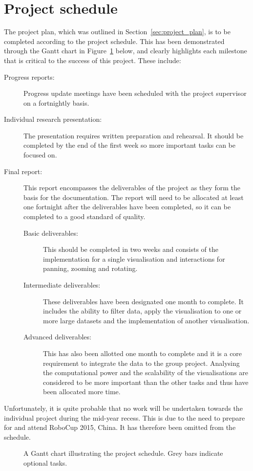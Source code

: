 \documentclass[a4paper]{article}
\begin{document}
	\section{Project schedule} {
	\label{sec:project_schedule}
	
		The project plan, which was outlined in Section~\ref{sec:project_plan}, is to be completed according to the project schedule. This has been demonstrated through the Gantt chart in Figure~\ref{gantt:schedule} below, and clearly highlights each milestone that is critical to the success of this project. These include:
		
		\begin{description}
			\item[Progress reports:] Progress update meetings have been scheduled with the project supervisor on a fortnightly basis.
			\item[Individual research presentation:] The presentation requires written preparation and rehearsal. It should be completed by the end of the first week so more important tasks can be focused on.
			\item[Final report:] This report encompasses the deliverables of the project as they form the basis for the documentation. The report will need to be allocated at least one fortnight after the deliverables have been completed, so it can be completed to a good standard of quality.
			\begin{description}
				\item[Basic deliverables:] This should be completed in two weeks and consists of the implementation for a single visualisation and interactions for panning, zooming and rotating.
				\item[Intermediate deliverables:] These deliverables have been designated one month to complete. It includes the ability to filter data, apply the visualisation to one or more large datasets and the implementation of another visualisation.
				\item[Advanced deliverables:] This has also been allotted one month to complete and it is a core requirement to integrate the data to the group project. Analysing the computational power and the scalability of the visualisations are considered to be more important than the other tasks and thus have been allocated more time.
			\end{description}
		\end{description}
		
		Unfortunately, it is quite probable that no work will be undertaken towards the individual project during the mid-year recess. This is due to the need to prepare for and attend RoboCup 2015, China. It has therefore been omitted from the schedule.
        
		\begin{figure}[H]
	        \resizebox{\textwidth}{!}{}
			\caption[Project schedule] {A Gantt chart illustrating the project schedule. Grey bars indicate optional tasks.}
			\label{gantt:schedule}
		\end{figure}
		
	}
	
\end{document}
